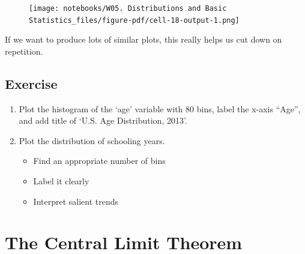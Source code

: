 \documentclass[
  letterpaper,
  DIV=11,
  numbers=noendperiod]{scrreprt}
\newenvironment{Shaded}{\begin{snugshade}}{\end{snugshade}}
\newcommand{\DecValTok}[1]{\textcolor[rgb]{0.68,0.00,0.00}{#1}}
\newcommand{\NormalTok}[1]{\textcolor[rgb]{0.00,0.23,0.31}{#1}}
\newcommand{\OperatorTok}[1]{\textcolor[rgb]{0.37,0.37,0.37}{#1}}
\newcommand{\StringTok}[1]{\textcolor[rgb]{0.13,0.47,0.30}{#1}}
\providecommand{\tightlist}{%
  \setlength{\itemsep}{0pt}\setlength{\parskip}{0pt}}\usepackage{longtable,booktabs,array}
\begin{document}
\begin{Shaded}
\end{Shaded}

\begin{figure}[H]

{\centering \texttt{[image: notebooks/W05. Distributions and Basic Statistics\_files/figure-pdf/cell-18-output-1.png]}

}

\end{figure}

If we want to produce lots of similar plots, this really helps us cut
down on repetition.

\hypertarget{exercise-13}{%
\subsection{Exercise}\label{exercise-13}}

\begin{enumerate}
\def\labelenumi{\arabic{enumi}.}
\tightlist
\item
  Plot the histogram of the `age' variable with 80 bins, label the
  x-axis ``Age'', and add title of `U.S. Age Distribution, 2013'.
\item
  Plot the distribution of schooling years.

  \begin{itemize}
  \tightlist
  \item
    Find an appropriate number of bins
  \item
    Label it clearly
  \item
    Interpret salient trends
  \end{itemize}
\end{enumerate}

\hypertarget{the-central-limit-theorem}{%
\section{The Central Limit Theorem}\label{the-central-limit-theorem}}
\end{document}
